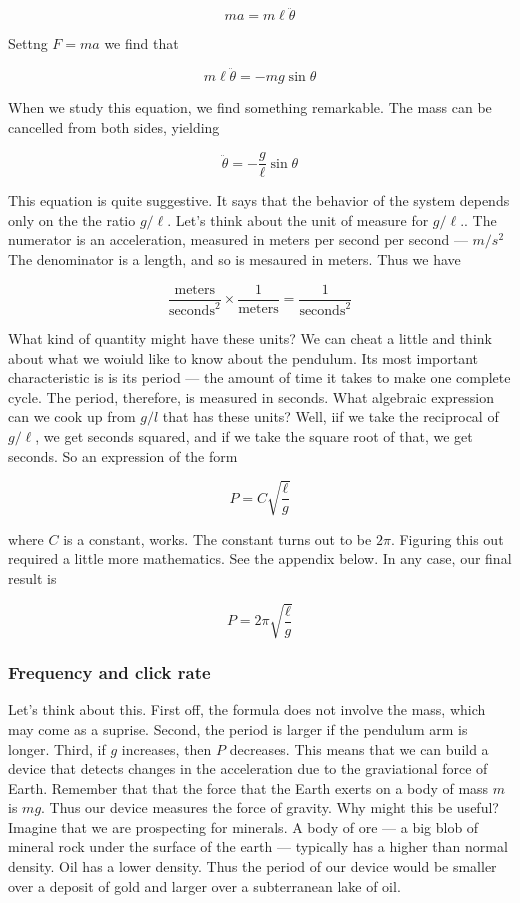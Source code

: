 $$
ma = m\ell \ddot \theta
$$

Settng $F = ma$ we find that 

$$ 
  m\ell \ddot \theta = - mg \sin\theta
$$


When we study this equation, we find something remarkable.  The mass can be cancelled from both sides, yielding

$$ 
 \ddot \theta = -\frac{g}{\ell} \sin\theta
$$

This equation is quite suggestive.  It says that the behavior of the system depends only on the the ratio $g/\ell$.  Let's think about the unit of measure for $g/\ell$.. The numerator is an acceleration, measured in meters per second per second — $m/s^2$ The denominator is a length, and so is mesaured in meters. Thus we have

$$
\frac{\text{meters}}{\text{seconds}^2} \times \frac{1}{\text{meters}} =  
\frac{1}{\text{seconds}^2}
$$

What kind of quantity might have these units?  We can cheat a little and think about what we woiuld like to know about  the pendulum. Its most important characteristic is is its period — the amount of time it takes to make one complete cycle.  The period, therefore, is measured in seconds.  What algebraic expression can we cook up from $g/l$ that has these units?  Well, iif we take the reciprocal of $g/\ell$, we get seconds squared, and if we take the square root of that, we get seconds.  So an expression of the form

$$
  P = C\sqrt{\frac{\ell}{g}}
$$

where $C$ is a constant, works.  The constant turns out to be $2\pi$.   Figuring this out required a little more mathematics.  See the appendix below. In any case, our final result is

$$
  P = 2\pi\sqrt{\frac{\ell}{g}}
$$

\subsubsection{Frequency and click rate}

Let's think about this.  First off, the formula does not involve the mass, which may come as a suprise.  Second, the period is larger if the pendulum arm is longer.  Third, if $g$ increases, then $P$ decreases.    This means that we can build a device that detects changes in the acceleration due to the graviational force of Earth.  Remember that that the force that the Earth exerts on a body of mass $m$ is $mg$.  Thus our device measures the force of gravity.  Why might this be useful?  Imagine that we are prospecting for minerals.  A body of ore — a big blob of mineral rock under the surface of the earth — typically has a higher than normal density.  Oil has a lower density.  Thus the period of our device would be smaller over a deposit of gold  and larger over a subterranean lake of oil.

